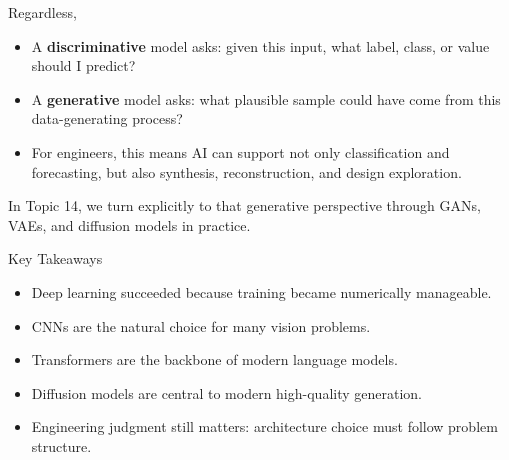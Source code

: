 \documentclass[12pt]{beamer}
\begin{document}
\begin{frame}{Regardless,}
  \begin{itemize}
    \item A \textbf{discriminative} model asks: given this input, what label, class, or value should I predict?
    \item A \textbf{generative} model asks: what plausible sample could have come from this data-generating process?
    \item For engineers, this means AI can support not only classification and forecasting, but also synthesis, reconstruction, and design exploration.
  \end{itemize}

  In Topic 14, we turn explicitly to that generative perspective through GANs, VAEs, and diffusion models in practice.
\end{frame}

\begin{frame}{Key Takeaways}
  \begin{itemize}
    \item Deep learning succeeded because training became numerically manageable.
    \item CNNs are the natural choice for many vision problems.
    \item Transformers are the backbone of modern language models.
    \item Diffusion models are central to modern high-quality generation.
    \item Engineering judgment still matters: architecture choice must follow problem structure.
  \end{itemize}
\end{frame}
\end{document}
